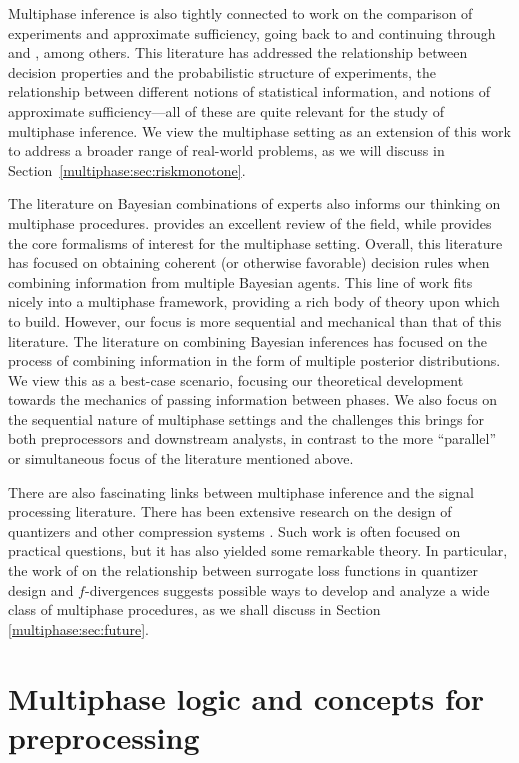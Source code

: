 Multiphase inference is also tightly connected to work on the comparison of experiments and approximate sufficiency, going back to \citet{Blackwell51,Blackwell53} and continuing through \citet{LeCam1964} and \citet{Goel79}, among others.
This literature has addressed the relationship between decision properties and the probabilistic structure of experiments, the relationship between different notions of statistical information, and notions of approximate sufficiency---all of these are quite relevant for the study of multiphase inference.
We view the multiphase setting as an extension of this work to address a broader range of real-world problems, as we will discuss in Section~\ref{multiphase:sec:riskmonotone}.

The literature on Bayesian combinations of experts also informs our thinking on multiphase procedures.
\citet{Kadane1993} provides an excellent review of the field, while \citet{Lindley1979} provides the core formalisms of interest for the multiphase setting.
Overall, this literature has focused on obtaining coherent (or otherwise favorable) decision rules when combining information from multiple Bayesian agents.
This line of work fits nicely into a multiphase framework, providing a rich body of theory upon which to build.
However, our focus is more sequential and mechanical than that of this literature.
The literature on combining Bayesian inferences has focused on the process of combining information in the form of multiple posterior distributions.
We view this as a best-case scenario, focusing our theoretical development towards the mechanics of passing information between phases.
We also focus on the sequential nature of multiphase settings and the challenges this brings for both preprocessors and downstream analysts, in contrast to the more ``parallel'' or simultaneous focus of the literature mentioned above.

There are also fascinating links between multiphase inference and the signal processing literature.
There has been extensive research on the design of quantizers and other compression systems \citep{Gray1998}.
Such work is often focused on practical questions, but it has also yielded some remarkable theory.
In particular, the work of \citet{Nguyen2009} on the relationship between surrogate loss functions in quantizer design and $f$-divergences suggests possible ways to develop and analyze a wide class of multiphase procedures, as we shall discuss  in Section \ref{multiphase:sec:future}.  

\section{Multiphase logic and concepts for preprocessing}
\label{multiphase:sec:concepts}

